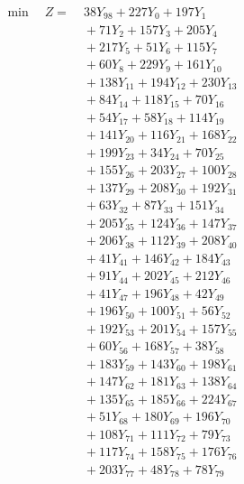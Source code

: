 \documentclass[a4paper,10pt]{article}
\begin{document}
\allowdisplaybreaks
{\small
\begin{align}
\min \quad Z = &\; 38 Y_{98} + 227 Y_{0} + 197 Y_{1} \\[0.3ex]
&\;  + 71 Y_{2} + 157 Y_{3} + 205 Y_{4} \\[0.3ex]
&\;  + 217 Y_{5} + 51 Y_{6} + 115 Y_{7} \\[0.3ex]
&\;  + 60 Y_{8} + 229 Y_{9} + 161 Y_{10} \\[0.3ex]
&\;  + 138 Y_{11} + 194 Y_{12} + 230 Y_{13} \\[0.3ex]
&\;  + 84 Y_{14} + 118 Y_{15} + 70 Y_{16} \\[0.3ex]
&\;  + 54 Y_{17} + 58 Y_{18} + 114 Y_{19} \\[0.3ex]
&\;  + 141 Y_{20} + 116 Y_{21} + 168 Y_{22} \\[0.3ex]
&\;  + 199 Y_{23} + 34 Y_{24} + 70 Y_{25} \\[0.3ex]
&\;  + 155 Y_{26} + 203 Y_{27} + 100 Y_{28} \\[0.5ex]\allowbreak
&\;  + 137 Y_{29} + 208 Y_{30} + 192 Y_{31} \\[0.3ex]
&\;  + 63 Y_{32} + 87 Y_{33} + 151 Y_{34} \\[0.3ex]
&\;  + 205 Y_{35} + 124 Y_{36} + 147 Y_{37} \\[0.3ex]
&\;  + 206 Y_{38} + 112 Y_{39} + 208 Y_{40} \\[0.3ex]
&\;  + 41 Y_{41} + 146 Y_{42} + 184 Y_{43} \\[0.3ex]
&\;  + 91 Y_{44} + 202 Y_{45} + 212 Y_{46} \\[0.3ex]
&\;  + 41 Y_{47} + 196 Y_{48} + 42 Y_{49} \\[0.3ex]
&\;  + 196 Y_{50} + 100 Y_{51} + 56 Y_{52} \\[0.3ex]
&\;  + 192 Y_{53} + 201 Y_{54} + 157 Y_{55} \\[0.3ex]
&\;  + 60 Y_{56} + 168 Y_{57} + 38 Y_{58} \\[0.5ex]\allowbreak
&\;  + 183 Y_{59} + 143 Y_{60} + 198 Y_{61} \\[0.3ex]
&\;  + 147 Y_{62} + 181 Y_{63} + 138 Y_{64} \\[0.3ex]
&\;  + 135 Y_{65} + 185 Y_{66} + 224 Y_{67} \\[0.3ex]
&\;  + 51 Y_{68} + 180 Y_{69} + 196 Y_{70} \\[0.3ex]
&\;  + 108 Y_{71} + 111 Y_{72} + 79 Y_{73} \\[0.3ex]
&\;  + 117 Y_{74} + 158 Y_{75} + 176 Y_{76} \\[0.3ex]
&\;  + 203 Y_{77} + 48 Y_{78} + 78 Y_{79} \\[0.3ex]

\end{align}}
\end{document}
